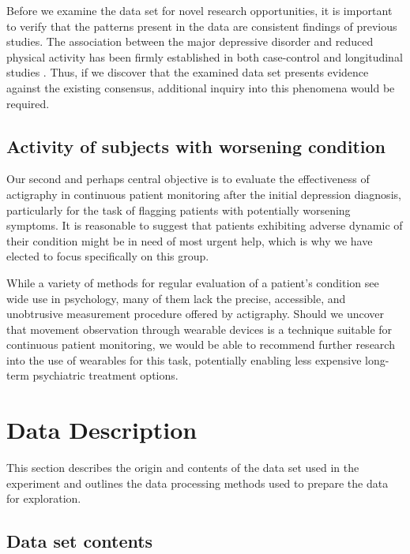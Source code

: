 \documentclass[12pt]{article}
\begin{document}
Before we examine the data set for novel research opportunities, it is important to verify that the patterns present in the data are consistent findings of previous studies. The association between the major depressive disorder and reduced physical activity has been firmly established in both case-control and longitudinal studies \parencite{Burton_2013}. Thus, if we discover that the examined data set presents evidence against the existing consensus, additional inquiry into this phenomena would be required.

\subsection{Activity of subjects with worsening condition}

Our second and perhaps central objective is to evaluate the effectiveness of actigraphy in continuous patient monitoring after the initial depression diagnosis, particularly for the task of flagging patients with potentially worsening symptoms. It is reasonable to suggest that patients exhibiting adverse dynamic of their condition might be in need of most urgent help, which is why we have elected to focus specifically on this group.

While a variety of methods for regular evaluation of a patient's condition see wide use in psychology, many of them lack the precise, accessible, and unobtrusive measurement procedure offered by actigraphy. Should we uncover that movement observation through wearable devices is a technique suitable for continuous patient monitoring, we would be able to recommend further research into the use of wearables for this task, potentially enabling less expensive long-term psychiatric treatment options.

\section{Data Description}

This section describes the origin and contents of the data set used in the experiment and outlines the data processing methods used to prepare the data for exploration.

\subsection{Data set contents}
\end{document}
